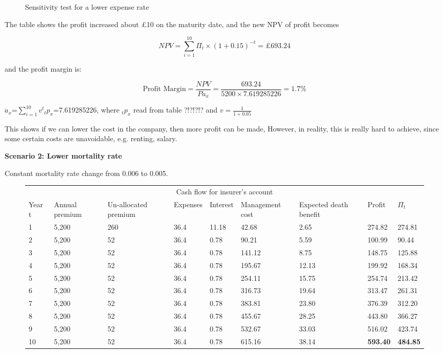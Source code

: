 \documentclass{report}
\begin{document}
{\begin{figure}[H]
\begin{tabular}{p{0.8cm} p{1.5cm} p{1.5cm} p{1.2cm} p{1cm} p{2cm}p{1.5cm} p{1.5cm} p{1.5cm} }
\bottomrule
\end{tabular}
\caption{Sensitivity test for a lower expense rate}
\label{determ-sensi-expense}
\end{figure}

The table shows the profit increased about \pounds 10 on the maturity date, and the new NPV of profit becomes 

\[
 NPV=\sum_{i=1}^{10} \Pi_t \times (1+0.15)^{-t} = \pounds693.24 
\]
 
and the profit margin is:

\[
\text{Profit Margin} =  \frac{NPV}{P \ddot{a}_x}= \frac{693.24 }{5200 \times 7.619285226} = 1.7\%
\]

$\ddot{a}_x$=$\sum_{i=1}^{10} v^t {_tp_x}$=7.619285226, where $_tp_x$ read from table ?!?!?!? and $v=\frac{1}{1+0.05}$ 

This shows if we can lower the cost in the company, then more profit can be made, However, in reality, this is really hard to achieve, since some certain costs are unavoidable, e.g. renting, salary.




\textbf{Scenario 2: Lower mortality rate} 

Constant mortality rate change from 0.006 to 0.005.



\begin{figure}[H]
\hfill
\begin{tabular}{p{0.8cm} p{1.5cm} p{1.5cm} p{1.2cm} p{1cm} p{2cm}p{1.5cm} p{1.5cm} p{1.5cm} }
\toprule
\multicolumn{9}{c}{Cash flow for insurer's account} \\
\cmidrule(r){3-7}

Year t & Annual premium & Un-allocated premium & Expenses & Interest &Management cost& Expected death benefit & Profit& $\Pi_t$  \\
\midrule

1&5,200&260&36.4&11.18&42.68&2.65&274.82&274.81\\
2&5,200&52&36.4&0.78&90.21&5.59&100.99&90.44\\
3&5,200&52&36.4&0.78&141.12&8.75&148.75&125.88\\
4&5,200&52&36.4&0.78&195.67&12.13&199.92&168.34\\
5&5,200&52&36.4&0.78&254.11&15.75&254.74&213.42\\
6&5,200&52&36.4&0.78&316.73&19.64&313.47&261.31\\
7&5,200&52&36.4&0.78&383.81&23.80&376.39&312.20\\
8&5,200&52&36.4&0.78&455.67&28.25&443.80&366.27\\
9&5,200&52&36.4&0.78&532.67&33.03&516.02&423.74\\
10&5,200&52&36.4&0.78&615.16&38.14&\textbf{593.40}&\textbf{484.85}\\


\end{tabular}
\end{figure}}
\end{document}
